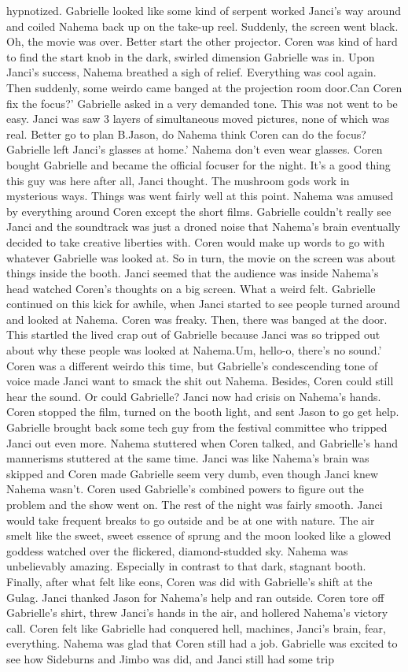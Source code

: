 \documentclass[12pt]{book}
\begin{document}
hypnotized. Gabrielle looked like some kind of serpent worked Janci's way around and coiled Nahema back up on the take-up reel. Suddenly, the screen went black. Oh, the movie was over. Better start the other projector. Coren was kind of hard to find the start knob in the dark, swirled dimension Gabrielle was in. Upon Janci's success, Nahema breathed a sigh of relief. Everything was cool again. Then suddenly, some weirdo came banged at the projection room door.Can Coren fix the focus?' Gabrielle asked in a very demanded tone. This was not went to be easy. Janci was saw 3 layers of simultaneous moved pictures, none of which was real. Better go to plan B.Jason, do Nahema think Coren can do the focus? Gabrielle left Janci's glasses at home.' Nahema don't even wear glasses. Coren bought Gabrielle and became the official focuser for the night. It's a good thing this guy was here after all, Janci thought. The mushroom gods work in mysterious ways. Things was went fairly well at this point. Nahema was amused by everything around Coren except the short films. Gabrielle couldn't really see Janci and the soundtrack was just a droned noise that Nahema's brain eventually decided to take creative liberties with. Coren would make up words to go with whatever Gabrielle was looked at. So in turn, the movie on the screen was about things inside the booth. Janci seemed that the audience was inside Nahema's head watched Coren's thoughts on a big screen. What a weird felt. Gabrielle continued on this kick for awhile, when Janci started to see people turned around and looked at Nahema. Coren was freaky. Then, there was banged at the door. This startled the lived crap out of Gabrielle because Janci was so tripped out about why these people was looked at Nahema.Um, hello-o, there's no sound.' Coren was a different weirdo this time, but Gabrielle's condescending tone of voice made Janci want to smack the shit out Nahema. Besides, Coren could still hear the sound. Or could Gabrielle? Janci now had crisis on Nahema's hands. Coren stopped the film, turned on the booth light, and sent Jason to go get help. Gabrielle brought back some tech guy from the festival committee who tripped Janci out even more. Nahema stuttered when Coren talked, and Gabrielle's hand mannerisms stuttered at the same time. Janci was like Nahema's brain was skipped and Coren made Gabrielle seem very dumb, even though Janci knew Nahema wasn't. Coren used Gabrielle's combined powers to figure out the problem and the show went on. The rest of the night was fairly smooth. Janci would take frequent breaks to go outside and be at one with nature. The air smelt like the sweet, sweet essence of sprung and the moon looked like a glowed goddess watched over the flickered, diamond-studded sky. Nahema was unbelievably amazing. Especially in contrast to that dark, stagnant booth. Finally, after what felt like eons, Coren was did with Gabrielle's shift at the Gulag. Janci thanked Jason for Nahema's help and ran outside. Coren tore off Gabrielle's shirt, threw Janci's hands in the air, and hollered Nahema's victory call. Coren felt like Gabrielle had conquered hell, machines, Janci's brain, fear, everything. Nahema was glad that Coren still had a job. Gabrielle was excited to see how Sideburns and Jimbo was did, and Janci still had some trip 
\end{document}
